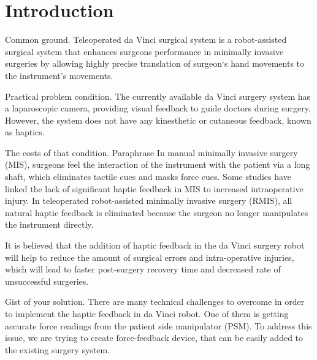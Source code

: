 \chapter{Introduction}
\label{intro} %


Common ground. Teleoperated da Vinci surgical system is a robot-assisted surgical system that enhances surgeons performance in minimally invasive surgeries by allowing highly precise translation of surgeon`s hand movements to the instrument's movements. 

Practical problem condition. The currently available da Vinci surgery system has a laparoscopic camera, providing visual feedback to guide doctors during surgery. However, the system does not have any kinesthetic or cutaneous feedback, known as haptics.\cite{_intuitive_2018} 

The costs of that condition. 
Paraphrase
In manual minimally invasive surgery (MIS), surgeons feel the interaction of the instrument with the patient via a long shaft, which eliminates tactile cues and masks force cues. Some studies have linked the lack of significant haptic feedback in MIS to increased intraoperative injury. In teleoperated robot-assisted minimally invasive surgery (RMIS), all natural haptic feedback is eliminated because the surgeon no longer manipulates the instrument directly.\cite{okamura_haptic_2009} 

It is believed that the addition of haptic feedback in the da Vinci surgery robot will help to reduce the amount of surgical errors and intra-operative injuries, which will lead to faster post-surgery recovery time and decreased rate of unsuccessful surgeries. \cite{reiley_effects_2008, van_der_meijden_value_2009, okamura_haptic_2009}

Gist of your solution. There are many technical challenges to overcome in order to implement the haptic feedback in da Vinci robot. One of them is getting accurate force readings from the patient side manipulator (PSM). To address this issue, we are trying to create force-feedback device, that can be easily added to the existing surgery system.
